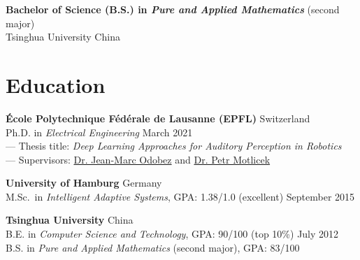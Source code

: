 \documentclass[a4paper,9pt]{extarticle} %
\newcommand{\ind}{\hspace*{1em}}
\begin{document}
\parbox{\textwidth}{%
\textbf{Bachelor of Science (B.S.) in \textit{Pure and Applied Mathematics}} (second major) \\
\ind{} Tsinghua University \hfill China
}

\iffalse{}


\section{Education}
\parbox{\textwidth}{%
\textbf{\'Ecole Polytechnique F\'ed\'erale de Lausanne (EPFL)} \hfill Switzerland \\
\ind{} Ph.D. in \textit{Electrical Engineering} \hfill March 2021 \\
\ind{} --- Thesis title: \textit{Deep Learning Approaches for Auditory Perception in Robotics} \\
\ind{} --- Supervisors: \href{https://idiap.ch/~odobez}{Dr. Jean-Marc Odobez} and \href{https://people.idiap.ch/pmotlic}{Dr. Petr Motlicek}
}

\parbox{\textwidth}{%
\textbf{University of Hamburg} \hfill Germany \\
\ind{} M.Sc.\ in \textit{Intelligent Adaptive Systems}, GPA\@: 1.38/1.0 (excellent)  \hfill September 2015%
}

\parbox{\textwidth}{%
\textbf{Tsinghua University} \hfill China \\
\ind{} B.E. in \textit{Computer Science and Technology}, GPA\@: 90/100 (top 10\%) \hfill July 2012 \\
\ind{} B.S. in \textit{Pure and Applied Mathematics} (second major), GPA\@: 83/100 %
}


\end{document}
